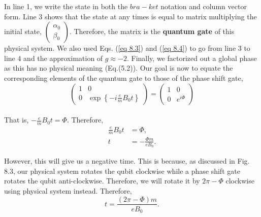 \documentclass{article}
\begin{document}
In line 1, we write the state in both the $bra-ket$ notation and column vector form.
Line 3 shows that the state at any times is equal to matrix multiplying the initial
state, $\begin{pmatrix}
\alpha_0\\ \beta_0    
\end{pmatrix}$. Therefore, the matrix is the \textbf{quantum gate} of this physical system.
We also used Eqs. (\ref{eq 8.3}) and (\ref{eq 8.4}) to go from line 3 to line 4 and the approximation
of $g\approx-2$. Finally, we factorized out a global phase as this has no physical meaning (Eq.(5.2)).
Our goal is now to equate the corresponding elements of the quantum gate to those of 
the phase shift gate,
\begin{equation}\label{eq 8.19}
    \begin{pmatrix}
        1&0\\0&\exp\left\{-i\frac{e}{m}B_0t\right\}
    \end{pmatrix}=\begin{pmatrix}
            1&0\\0&e^{i\varPhi}
        \end{pmatrix}\tag{8.19}
\end{equation}\\
That is, $-\frac{e}{m}B_0t=\varPhi$. Therefore,
\begin{align*}\label{eq 8.20}
    \frac{e}{m}B_0t&=\varPhi,\\
    t&=-\frac{\varPhi m}{eB_0}.\tag{8.20}
\end{align*}

However, this will give us a negative time. This is because, as discussed in Fig. 8.3, our physical system rotates the qubit clockwise while
a phase shift gate rotates the qubit anti-clockwise. Therefore, we will rotate it by $2\pi-\varPhi$ clockwise
using physical system instead. Therefore,
\begin{equation}\label{eq 8.21}
    t=\frac{(2\pi-\varPhi)m}{eB_0}.\tag{8.21}
\end{equation}
\end{document}

